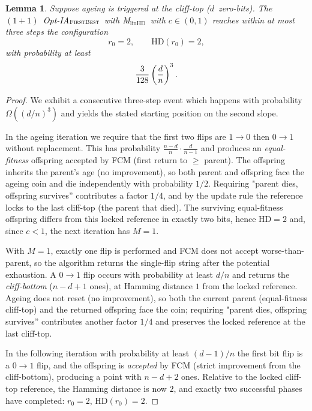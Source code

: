 \documentclass[lettersize,journal]{IEEEtran}
\newcommand{\rerev}[1]{\textcolor{black}{#1}}
\newcommand{\rev}[1]{\textcolor{black}{#1}}
\newcommand{\HD}{\text{HD}}
\newcommand{\linHD}{M$_{\text{linHD}}$}
\newcommand{\firstBest}{$(1+1)$~Opt-IA$_{\textsc{FirstBest}}$}
\newtheorem{lemma}{Lemma}
\begin{document}
 
{







\setcounter{lemma}{3}
\begin{lemma}%
	Suppose ageing is triggered at the cliff-top ($d$~zero-bits).  
	The \rev{\firstBest}~with \linHD\ with $c\in(0,1)$ reaches within at most three steps the 
	configuration
	\[
	r_0=2, \qquad \mathrm{HD}(r_0)=2,
	\]
	with probability at least 
	\[
	\rerev{\frac{3}{128}}\left(\frac{d}{n}\right)^3.
	\]
\end{lemma}

\begin{proof}
	We exhibit a consecutive three-step event which happens with probability $\Omega((d/n)^3)$ and yields the stated starting 
	position on the second slope.
	
	 In the ageing iteration we require that the first two flips are $1\!\to 0$ then $0\!\to 1$ without replacement. This has probability $\frac{n-d}{n}\cdot\frac{d}{n-1}$ and produces an \emph{equal-fitness} offspring accepted by FCM (first return to $\ge$ parent). The offspring inherits the parent's age (no improvement), so both parent and offspring face the ageing coin and die independently with probability $1/2$. Requiring "parent dies, offspring survives'' contributes a factor $1/4$, and by the update rule the reference locks to the last cliff-top (the parent that died). The surviving equal-fitness offspring differs from this locked reference in exactly two bits, hence $\HD=2$ and, since $c<1$, the next iteration has $M=1$.
		
 With $M=1$, exactly one flip is performed and FCM does not accept worse-than-parent, so the algorithm returns the single-flip string after the potential exhaustion. A $0\!\to 1$ flip occurs with probability at least $d/n$ and returns the \emph{cliff-bottom} ($n-d+1$ ones), at Hamming distance $1$ from the locked reference. Ageing does not reset (no improvement), so both the current parent (equal-fitness cliff-top) and the returned offspring face the coin; requiring "parent dies, offspring survives'' contributes another factor $1/4$ and preserves the locked reference at the last cliff-top.
	
 In the following iteration with probability at least $(d-1)/n$ the first bit flip is a $0\!\to 1$ flip, and the offspring is \emph{accepted} by FCM (strict improvement from the cliff-bottom), producing a point with $n-d+2$ ones. Relative to the locked cliff-top reference, the Hamming distance is now $2$, and exactly two successful phases have completed: $r_0=2$, $\HD(r_0)=2$.
	

\end{proof}}
\end{document}
